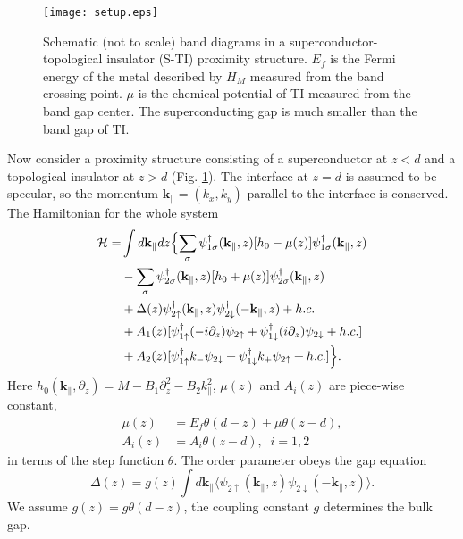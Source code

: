 \documentclass[11pt,revtex,aps]{report}
\newcommand{\kp}{k_{+}}
\newcommand{\ki}{k_{-}}
\newcommand{\idz}{i\partial_z}
\begin{document}
\begin{figure}
\center
\texttt{[image: setup.eps]}
\caption{Schematic (not to scale) band diagrams  in a superconductor-topological insulator (S-TI) proximity
structure. $E_f$ is the Fermi energy of the metal described by $H_M$ measured from the band crossing point. $\mu$ is
the chemical potential of TI measured from the band gap center. The superconducting gap
is much smaller than the band gap of TI.
}\label{setup}
\end{figure}

Now consider a proximity structure consisting 
of a superconductor at $z<d$ and a topological insulator at $z>d$ (Fig. \ref{setup}).
The interface at $z=d$ is assumed to be specular, so the momentum $\mathbf{k_\parallel}=(k_x,k_y)$ 
parallel to the interface is conserved. The Hamiltonian for the whole system 
\begin{align}
\mathcal{H} = &\int d \mathbf{k}_\parallel dz
\Bigl\{ \sum_{\sigma} \psi^{\dagger}_{1 \sigma}(\mathbf{k}_\parallel,z)[h_0 - \mu(z)] \psi^{\dagger}_{1 \sigma}(\mathbf{k}_\parallel,z) 
 \nonumber \\
&- \sum_{\sigma} \psi^{\dagger}_{2 \sigma}(\mathbf{k}_\parallel,z)[h_0 + \mu(z)] \psi^{\dagger}_{2 \sigma}(\mathbf{k}_\parallel,z)\nonumber \\
&+\Delta(z)  \psi^{\dagger}_{2 \uparrow}(\mathbf{k}_\parallel,z) \psi^{\dagger}_{2 \downarrow} (-\mathbf{k}_\parallel,z)+h.c.\nonumber \\
&+A_1(z) [\psi^{\dagger}_{1 \uparrow} (-\idz) \psi_{2 \uparrow} 
+\psi^{\dagger}_{1 \downarrow} (\idz) \psi_{2 \downarrow}+h.c.]  \nonumber\\
&+A_2(z)
[\psi^{\dagger}_{1 \uparrow} \ki \psi_{2 \downarrow} +\psi^{\dagger}_{1 \downarrow} \kp \psi_{2 \uparrow} +h.c.]
\Bigr \}. \label{hbH}
\end{align}
Here $h_0(\mathbf{k}_\parallel, \partial_z)=M -B_1 \partial_z^2 -B_2 k_\parallel^2$, $\mu(z)$ and $A_i(z)$
are piece-wise constant, 
\begin{align}
\mu(z)&=E_f\theta(d-z)+\mu\theta(z-d),\\
A_i(z)&=A_i\theta(z-d),\;\;i=1,2
\end{align}
in terms of the step function $\theta$. The order parameter obeys the gap equation
\begin{equation}
\Delta(z) = g(z) \int d \mathbf{k}_\parallel \langle {\psi_{2 \uparrow}(\mathbf{k}_\parallel,z) \psi_{2 \downarrow}(-\mathbf{k}_\parallel,z) }\rangle. \label{gapE}
\end{equation}
We assume $g(z)=g\theta(d-z)$, the coupling constant $g$ determines the bulk gap.
\end{document}
